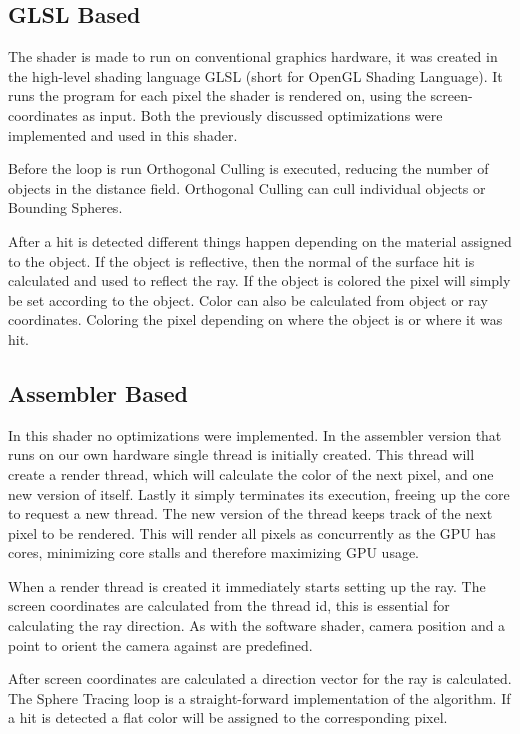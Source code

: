 		\subsection{GLSL Based}
	
			The shader is made to run on conventional graphics hardware, it was
			created in the high-level shading language GLSL (short for OpenGL
			Shading Language). It runs the program for each pixel the shader is
			rendered on, using the screen-coordinates as input. Both the 
			previously discussed optimizations were implemented and used in this
			shader.
			
			Before the loop is run Orthogonal Culling is executed, reducing the
			number of objects in the distance field. Orthogonal Culling can cull
			individual objects or Bounding Spheres. 
			
			After a hit is detected different things happen depending on the material
			assigned to the object. If the object is reflective, then the normal of the
			surface hit is calculated and used to reflect the ray. If the object is
			colored the pixel will simply be set according to the object. Color can
			also be calculated from object or ray coordinates. Coloring the pixel
			depending on where the object is or where it was hit.

		\subsection{Assembler Based}

			In this shader no optimizations were implemented. In the assembler 
			version that runs on our own hardware single thread is initially 
			created. This thread will create a render thread, which will 
			calculate the color of the next pixel, and one new version of
            itself. Lastly it simply terminates its execution, freeing up the 
            core to request a new thread. The new version of the thread keeps 
            track of the next pixel to be rendered. This will render all pixels 
            as concurrently as the GPU has cores, minimizing core stalls and 
            therefore maximizing GPU usage.

			When a render thread is created it immediately starts setting up the
			ray. The screen coordinates are calculated from the thread id, this 
			is essential for calculating the ray direction. As with the software
			shader, camera position and a point	to orient the camera against are 
			predefined. 

			After screen coordinates are calculated a direction vector for the 
			ray is calculated. The Sphere Tracing loop is a straight-forward 
			implementation of the algorithm. If a hit is detected a flat color 
			will be assigned to the corresponding pixel.



